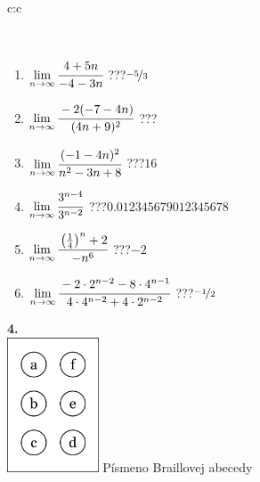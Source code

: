 \documentclass[10pt]{report}
\begin{document}
\begin{tabular}{c:c}
\begin{minipage}[c][104.5mm][t]{0.5\linewidth}
\begin{center}
\begin{minipage}{0.95\linewidth}
\begin{center}
\end{center}
\end{minipage}
\\[1mm]
\begin{minipage}{0.79\linewidth}
\begin{center}
\begin{varwidth}{\linewidth}
\begin{enumerate}
\normalsize
\item $\lim\limits_{n\to\infty}\cfrac{4+5n}{-4-3n}$\quad \dotfill\; ???\;\dotfill \quad $\nicefrac{-5}{3}$
\item $\lim\limits_{n\to\infty}\cfrac{-2(-7-4n)}{(4n+9)^2}$\quad \dotfill\; ???\;\dotfill {}
\item $\lim\limits_{n\to\infty}\cfrac{(-1-4n)^2}{n^2-3n+8}$\quad \dotfill\; ???\;\dotfill \quad $16$
\item $\lim\limits_{n\to\infty}\cfrac{3^{n-4}}{3^{n-2}}$\quad \dotfill\; ???\;\dotfill \quad $0.012345679012345678$
\item $\lim\limits_{n\to\infty}\cfrac{\left(\frac{1}{4}\right)^n +2}{-n^{6}}$\quad \dotfill\; ???\;\dotfill \quad $-2$
\item $\lim\limits_{n\to\infty}\cfrac{-2\cdot 2^{n-2}-8\cdot 4^{n-1}}{4\cdot 4^{n-2}+4\cdot 2^{n-2}}$\quad \dotfill\; ???\;\dotfill \quad $\nicefrac{-1}{2}$
\end{enumerate}
\end{varwidth}
\end{center}
\end{minipage}
\begin{minipage}{0.20\linewidth}
\begin{center}
{\Huge\bfseries 4.} \\[2mm]
\includegraphics[height=40mm]{../images/braille.png}
{\small Písmeno Braillovej abecedy}
\end{center}
\end{minipage}
\end{center}
\end{minipage}
%
\end{tabular}
\newpage
\thispagestyle{empty}
\end{document}

